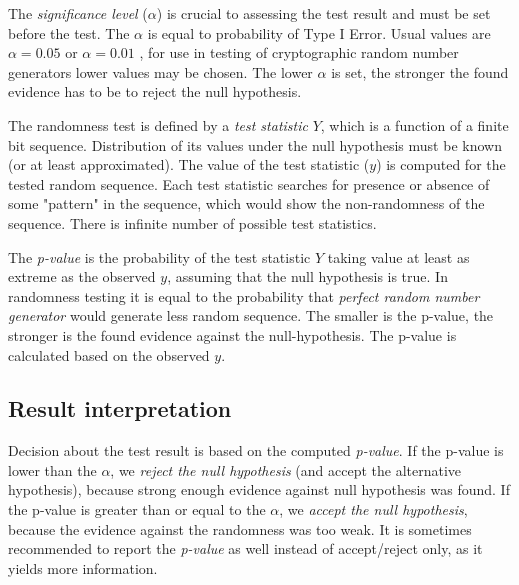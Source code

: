\documentclass[
  digital,     %
  oneside,     %
  nosansbold,  %
  nocolorbold, %
  nolof,         %
  nolot,         %
]{fithesis4}
\begin{document}
The \emph{significance level} ($\alpha$) is crucial to assessing the test result and must be set before the test. The $\alpha$ is equal to probability of Type I Error. Usual values are $\alpha = 0.05$ or $\alpha = 0.01$ \cite[p. 390]{basic_practice}, for use in testing of cryptographic random number generators lower values may be chosen. \cite[p. 1-4]{nist_special} The lower $\alpha$ is set, the stronger the found evidence has to be to reject the null hypothesis. %


The randomness test is defined by a \emph{test statistic} $Y$, which is a function of a finite bit sequence. Distribution of its values under the null hypothesis must be known (or at least approximated). The value of the test statistic ($y$) is computed for the tested random sequence. Each test statistic searches for presence or absence of some "pattern" in the sequence, which would show the non-randomness of the sequence. There is infinite number of possible test statistics. \cite[p. 4]{tu01_paper}


The \emph{p-value} is the probability of the test statistic $Y$ taking value at least as extreme as the observed $y$, assuming that the null hypothesis is true. In randomness testing it is equal to the probability that \emph{perfect random number generator} would generate less random sequence. The smaller is the p-value, the stronger is the found evidence against the null-hypothesis. \cite[p. 386]{basic_practice} The p-value is calculated based on the observed $y$.



\subsection{Result interpretation} \label{chap:rand-interpretation}

Decision about the test result is based on the computed \emph{p-value}. If the p-value is lower than the $\alpha$, we \emph{reject the null hypothesis} (and accept the alternative hypothesis), because strong enough evidence against null hypothesis was found. If the p-value is greater than or equal to the $\alpha$, we \emph{accept the null hypothesis}, because the evidence against the randomness was too weak. \cite[p. 390]{basic_practice} It is sometimes recommended to report the \emph{p-value} as well instead of accept/reject only, as it yields more information. \cite[p. 90]{tu01_guide}
\end{document}
